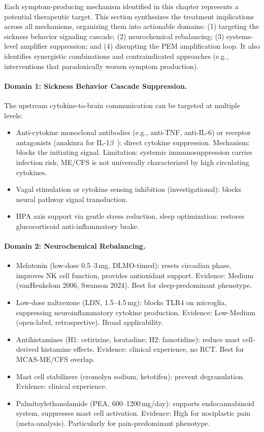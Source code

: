 Each symptom-producing mechanism identified in this chapter represents a potential therapeutic target. This section synthesizes the treatment implications across all mechanisms, organizing them into actionable domains: (1) targeting the sickness behavior signaling cascade; (2) neurochemical rebalancing; (3) systems-level amplifier suppression; and (4) disrupting the PEM amplification loop. It also identifies synergistic combinations and contraindicated approaches (e.g., interventions that paradoxically worsen symptom production).

\paragraph{Domain 1: Sickness Behavior Cascade Suppression.} The upstream cytokine-to-brain communication can be targeted at multiple levels:
\begin{itemize}
  \item Anti-cytokine monoclonal antibodies (e.g., anti-TNF, anti-IL-6) or receptor antagonists (anakinra for IL-1$\beta$~\cite{Roerink2017anakinra}): direct cytokine suppression. Mechanism: blocks the initiating signal. Limitation: systemic immunosuppression carries infection risk; ME/CFS is not universally characterized by high circulating cytokines.
  \item Vagal stimulation or cytokine sensing inhibition (investigational): blocks neural pathway signal transduction.
  \item HPA axis support via gentle stress reduction, sleep optimization: restores glucocorticoid anti-inflammatory brake.
\end{itemize}

\paragraph{Domain 2: Neurochemical Rebalancing.}
\begin{itemize}
  \item Melatonin (low-dose 0.5--3\,mg, DLMO-timed): resets circadian phase, improves NK cell function, provides antioxidant support. Evidence: Medium (vanHeukelom 2006, Swanson 2024). Best for sleep-predominant phenotype.
  \item Low-dose naltrexone (LDN, 1.5--4.5\,mg): blocks TLR4 on microglia, suppressing neuroinflammatory cytokine production. Evidence: Low-Medium (open-label, retrospective). Broad applicability.
  \item Antihistamines (H1: cetirizine, loratadine; H2: famotidine): reduce mast cell-derived histamine effects. Evidence: clinical experience, no RCT. Best for MCAS-ME/CFS overlap.
  \item Mast cell stabilizers (cromolyn sodium, ketotifen): prevent degranulation. Evidence: clinical experience.
  \item Palmitoylethanolamide (PEA, 600--1200\,mg/day): supports endocannabinoid system, suppresses mast cell activation. Evidence: High for nociplastic pain (meta-analysis). Particularly for pain-predominant phenotype.
\end{itemize}


